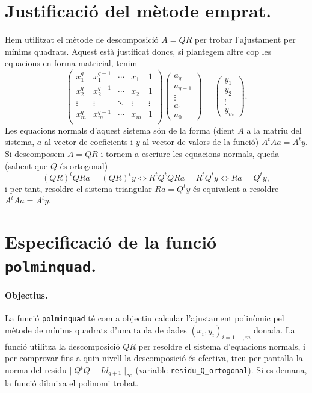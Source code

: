 \documentclass[11pt]{article}
\newcommand{\norminf}[1]{||#1||_{\infty}}
\begin{document}
\section{Justificació del mètode emprat.}
Hem utilitzat el mètode de descomposició $A=QR$ per trobar l'ajustament per mínims quadrats. Aquest està justificat doncs, si plantegem altre cop les equacions en forma matricial, tenim
\begin{equation}
    \begin{pmatrix}
    x_1^q & x_1^{q-1} & \cdots & x_1 & 1\\
    x_2^q & x_2^{q-1} & \cdots & x_2 & 1\\
    \vdots & \vdots & \ddots & \vdots & \vdots\\
    x_m^q & x_m^{q-1} & \cdots & x_m & 1\\
    \end{pmatrix}
    \begin{pmatrix}
    a_q\\
    a_{q-1}\\
    \vdots\\
    a_1\\
    a_0
    \end{pmatrix}
    =\begin{pmatrix}
    y_1\\
    y_2\\
    \vdots\\
    y_m
    \end{pmatrix}.
\end{equation}
Les equacions normals d'aquest sistema són de la forma (dient $A$ a la matriu del sistema, $a$ al vector de coeficients i $y$ al vector de valors de la funció) $A^tAa=A^ty$. Si descomposem $A=QR$ i tornem a escriure les equacions normals, queda (sabent que $Q$ és ortogonal)
\[
(QR)^tQRa=(QR)^ty\iff R^tQ^tQRa=R^tQ^ty\iff Ra=Q^ty,
\]
i per tant, resoldre el sistema triangular $Ra=Q^ty$ és equivalent a resoldre $A^tAa=A^ty$.
\section{Especificació de la funció \texttt{polminquad}.}
\paragraph{Objectius.} La funció \texttt{polminquad} té com a objectiu calcular l'ajustament polinòmic pel mètode de mínims quadrats d'una taula de dades $(x_i,y_i)_{i=1,\ldots,m}$ donada. La funció utilitza la descomposició $QR$ per resoldre el sistema d'equacions normals, i per comprovar fins a quin nivell la descomposició és efectiva, treu per pantalla la norma del residu $\norminf{Q^tQ-Id_{q+1}}$ (variable \texttt{residu_Q_ortogonal}). Si es demana, la funció dibuixa el polinomi trobat.
\end{document}
